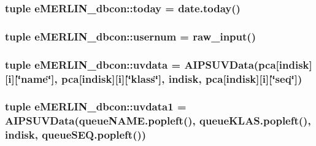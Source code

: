 \hypertarget{namespacee_m_e_r_l_i_n__dbcon_a504efe89c5a32a95950b6c5e078315e5}{
\subsubsection[{today}]{\setlength{\rightskip}{0pt plus 5cm}tuple {\bf e\-M\-E\-R\-L\-I\-N\-\_\-dbcon\-::today} = date.\-today()}}\label{namespacee_m_e_r_l_i_n__dbcon_a504efe89c5a32a95950b6c5e078315e5}
\hypertarget{namespacee_m_e_r_l_i_n__dbcon_a38e946965ca0b344061675a1a395cb08}{
\subsubsection[{usernum}]{\setlength{\rightskip}{0pt plus 5cm}tuple {\bf e\-M\-E\-R\-L\-I\-N\-\_\-dbcon\-::usernum} = raw\-\_\-input()}}\label{namespacee_m_e_r_l_i_n__dbcon_a38e946965ca0b344061675a1a395cb08}
\hypertarget{namespacee_m_e_r_l_i_n__dbcon_a2cd3578d0533cf504b1b59ae5521fe7a}{
\subsubsection[{uvdata}]{\setlength{\rightskip}{0pt plus 5cm}tuple {\bf e\-M\-E\-R\-L\-I\-N\-\_\-dbcon\-::uvdata} = \-A\-I\-P\-S\-U\-V\-Data({\bf pca}\mbox{[}{\bf indisk}\mbox{]}\mbox{[}{\bf i}\mbox{]}\mbox{[}\char`\"{}name\char`\"{}\mbox{]}, pca\mbox{[}{\bf indisk}\mbox{]}\mbox{[}{\bf i}\mbox{]}\mbox{[}\char`\"{}klass\char`\"{}\mbox{]}, indisk, {\bf pca}\mbox{[}{\bf indisk}\mbox{]}\mbox{[}{\bf i}\mbox{]}\mbox{[}\char`\"{}seq\char`\"{}\mbox{]})}}\label{namespacee_m_e_r_l_i_n__dbcon_a2cd3578d0533cf504b1b59ae5521fe7a}
\hypertarget{namespacee_m_e_r_l_i_n__dbcon_ab9be6ea6704da37fee2dea65d409a370}{
\subsubsection[{uvdata1}]{\setlength{\rightskip}{0pt plus 5cm}tuple {\bf e\-M\-E\-R\-L\-I\-N\-\_\-dbcon\-::uvdata1} = \-A\-I\-P\-S\-U\-V\-Data(queue\-N\-A\-M\-E.\-popleft(), queue\-K\-L\-A\-S.\-popleft(), {\bf indisk}, queue\-S\-E\-Q.\-popleft())}}\label{namespacee_m_e_r_l_i_n__dbcon_ab9be6ea6704da37fee2dea65d409a370}
